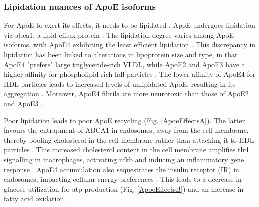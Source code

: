 \documentclass{amsart}
\begin{document}
\subsubsection{Lipidation nuances of ApoE isoforms}
For ApoE to exert its effects, it needs to be lipidated \cite{Husain2021APOETherapeutics}. ApoE undergoes lipidation via \acrfull{abca1}, a lipid efflux protein \cite{Flowers2020APOEBrain, Courtney2016LXRDisease}. The lipidation degree varies among ApoE isoforms, with ApoE4 exhibiting the least efficient lipidation \cite{Hu2015OpposingMice, Heinsinger2016ApolipoproteinFluid}. This discrepancy in lipidation has been linked to alterations in lipoprotein size and type, in that ApoE4 "prefers" large triglyceride-rich VLDL, while ApoE2 and ApoE3 have a higher affinity for phospholipid-rich \acrshort{hdl} particles \cite{Nguyen2010MolecularE4}. The lower affinity of ApoE4 for HDL particles leads to increased levels of unlipidated ApoE, resulting in its aggregation \cite{Hatters2006ApolipoproteinFunction}. Moreover, ApoE4 fibrils are more neurotoxic than those of ApoE2 and ApoE3 \cite{Hatters2006Amino-terminalFibrils}.

Poor lipidation leads to poor ApoE recycling \cite{Yassine2020APOEDisease} (Fig. \ref{ApoeEffectsA}). The latter favours the entrapment of ABCA1 in endosomes, away from the cell membrane, thereby pooling cholesterol in the cell membrane rather than attaching it to HDL particles \cite{Rawat2019ApoE4Astrocytes}. This increased cholesterol content in the cell membrane amplifies \acrfull{tlr4} signalling in macrophages, activating \acrshort{nfkb} and inducing an inflammatory gene response \cite{Yassine2020APOEDisease}.  ApoE4 accumulation also sequestrates the insulin receptor (IR) in endosomes, impacting cellular energy preferences \cite{Zhao2017ApolipoproteinEndosomes}. This leads to a decrease in glucose utilization for \acrshort{atp} production (Fig. \ref{ApoeEffectsB}) and an increase in fatty acid oxidation \cite{Svennerholm1997ChangesSwedes}. 
\end{document}
